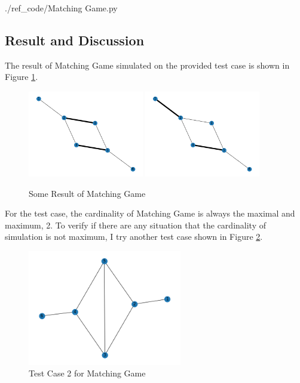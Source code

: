 \documentclass[a4paper, oneside, final, 12pt]{scrartcl} %
\begin{document}

  {./ref_code/Matching Game.py}

\subsection{Result and Discussion}

The result of Matching Game simulated on the provided test case 
is shown in Figure \ref{fig:Result of Matching Game}.

\begin{figure}[h]
  \centering
  \includegraphics[width=0.45\textwidth]{./image/result_match_game.png}
  \includegraphics[width=0.45\textwidth]{./image/result_match_game_2.png}
  \caption{Some Result of Matching Game}
  \label{fig:Result of Matching Game}
\end{figure}

For the test case, the cardinality of Matching Game is always the maximal and maximum, 2.
To verify if there are any situation that the cardinality of simulation is not maximum,
I try another test case shown in Figure \ref{fig:Another Test Case Graph}.

\begin{figure}[h]
  \centering
  \includegraphics[width=0.6\textwidth]{./image/original_graph_2.png}
  \caption{Test Case 2  for Matching Game}
  \label{fig:Another Test Case Graph}
\end{figure}
\end{document}
